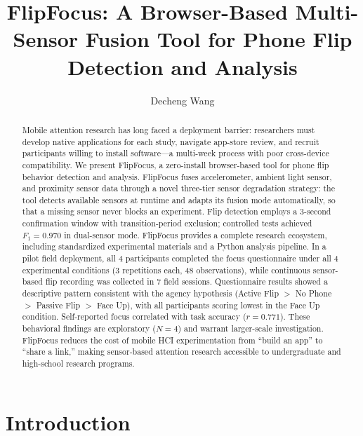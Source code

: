 \documentclass[sigconf]{acmart}
\begin{document}
\title{FlipFocus: A Browser-Based Multi-Sensor Fusion Tool for Phone Flip Detection and Analysis}

\author{Decheng Wang}

\begin{abstract}
Mobile attention research has long faced a deployment barrier: researchers must develop native applications for each study, navigate app-store review, and recruit participants willing to install software---a multi-week process with poor cross-device compatibility. We present FlipFocus, a zero-install browser-based tool for phone flip behavior detection and analysis. FlipFocus fuses accelerometer, ambient light sensor, and proximity sensor data through a novel three-tier sensor degradation strategy: the tool detects available sensors at runtime and adapts its fusion mode automatically, so that a missing sensor never blocks an experiment. Flip detection employs a 3-second confirmation window with transition-period exclusion; controlled tests achieved $F_1=0.970$ in dual-sensor mode. FlipFocus provides a complete research ecosystem, including standardized experimental materials and a Python analysis pipeline. In a pilot field deployment, all 4 participants completed the focus questionnaire under all 4 experimental conditions (3 repetitions each, 48 observations), while continuous sensor-based flip recording was collected in 7 field sessions. Questionnaire results showed a descriptive pattern consistent with the agency hypothesis (Active Flip $>$ No Phone $>$ Passive Flip $>$ Face Up), with all participants scoring lowest in the Face Up condition. Self-reported focus correlated with task accuracy ($r=0.771$). These behavioral findings are exploratory ($N=4$) and warrant larger-scale investigation. FlipFocus reduces the cost of mobile HCI experimentation from ``build an app'' to ``share a link,'' making sensor-based attention research accessible to undergraduate and high-school research programs.
\end{abstract}

\maketitle

\section{Introduction}
\end{document}
